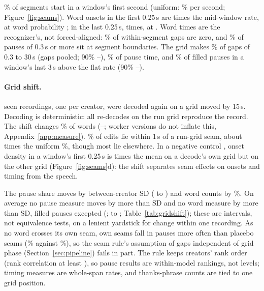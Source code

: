 \SegStartSecZeroPct\% of segments start in a window's first second (uniform: \UniformSecondPct\% per second;
Figure~\ref{fig:seams}). Word onsets in the first 0.25\,s are \OnsetFirstQuarter{} times the mid-window rate, at word
probability \WordProbFirstQuarter; in the last 0.25\,s, \OnsetLastQuarter{} times, at \WordProbLastQuarter. Word times
are the recognizer's, not forced-aligned: \ZeroGapPct\% of within-segment gaps
are zero, and \PauseAtBoundaryPct\% of pauses of 0.3\,s or more sit at segment boundaries. The grid makes
\GridPauseSurplusPct\% of gaps of 0.3 to 30\,s (gaps pooled; 90\% \GridPauseSurplusLo--\GridPauseSurplusHi), \GridPauseTimePct\% of pause time, and
\GridFillerLastThreePct\% of filled pauses in a window's last 3\,s above the flat rate (90\%
\GridFillerLastThreeLo--\GridFillerLastThreeHi).

\paragraph{Grid shift.} \GsRecordings{} seen recordings, one per creator, were decoded again on a grid moved by 15\,s.
Decoding is deterministic: all \GsControlIdentical{} re-decodes on the run grid reproduce the record. The shift changes
\GsChangedPct\% of words (\GsChangedLo--\GsChangedHi; worker versions do not inflate this, Appendix~\ref{app:measure}).
\GsEditsNearRunSeamPct\% of edits lie within 1\,s of a run-grid seam, about \GsNearSeamRatio{} times the uniform
\GsUniformNearSeamPct\%, though most lie elsewhere. In a negative control \cite{lipsitch2010negative}, onset density in
a window's first 0.25\,s is \GsOnsetFirstOwn{} times the mean on a decode's own grid but \GsOnsetFirstPlacebo{} on the
other grid (Figure~\ref{fig:seams}d): the shift separates seam effects on onsets and timing from the speech.

The pause share moves by \GsPauseShareSd{} between-creator SD (\GsPauseShareSdLo{} to \GsPauseShareSdHi) and word
counts by \GsWordsDiffPct\%. On average no pause measure moves by more than \GsPauseSdMax{} SD and no word measure by
more than \GsWordSdMax{} SD, filled pauses excepted (\GsFillerSd; \GsFillerSdLo{} to \GsFillerSdHi;
Table~\ref{tab:gridshift}); these are intervals, not equivalence tests, on a lenient yardstick for change within one
recording. As no word crosses its own seam, own seams fall in pauses more often than placebo seams
(\GsSeamInPauseOwnPct\% against \GsSeamInPausePlaceboPct\%), so the seam rule's assumption of gaps independent of grid
phase (Section~\ref{sec:pipeline}) fails in part. The rule keeps creators' rank order (rank correlation at least
\SeamRuleRankCorrMin), so pause results are within-model rankings, not levels; timing measures are whole-span rates,
and thanks-phrase counts are tied to one grid position.

